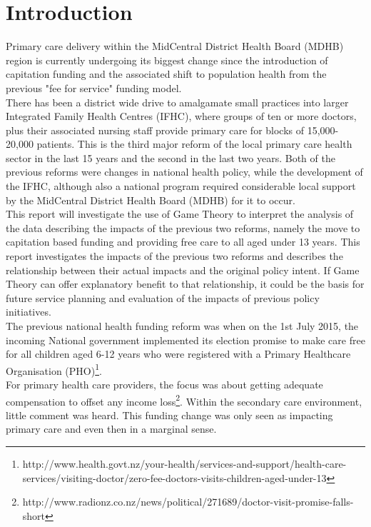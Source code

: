 \documentclass[11pt,a4paper]{article}
\begin{document}
\tableofcontents

\pagebreak
\pagebreak

\listoffigures

\pagebreak
\section{Introduction}
Primary care delivery within the MidCentral District Health Board (MDHB) region is currently undergoing its biggest change since the introduction of capitation funding and the associated shift to population health from the previous "fee for service" funding model.\\

There has been a district wide drive to amalgamate small practices into larger Integrated Family Health Centres (IFHC), where groups of ten or more doctors, plus their associated nursing staff provide primary care for blocks of  15,000-20,000 patients. This is the third major reform of the local primary care health sector in the last 15 years and the second in the last two years. Both of the previous reforms were changes in national health policy, while the development of the IFHC, although also a national program required considerable local support by the MidCentral District Health Board (MDHB) for it to occur. \\

This report will investigate the use of Game Theory to interpret the analysis of the data describing the impacts of the previous two reforms, namely the move to capitation based funding and providing free care to all aged under 13 years. This report investigates the impacts of the previous two reforms and describes the relationship between their actual impacts and the original policy intent. If Game Theory can offer explanatory benefit to that relationship, it could be the basis for future service planning and evaluation of the impacts of previous policy initiatives.\\ 

The previous national health funding reform was when on the 1st July 2015, the incoming National government implemented its election promise to make care free for all children aged 6-12 years who were registered with a Primary Healthcare Organisation (PHO)\footnote{http://www.health.govt.nz/your-health/services-and-support/health-care-services/visiting-doctor/zero-fee-doctors-visits-children-aged-under-13}.\\

For primary health care providers, the focus was about getting adequate compensation to offset any income loss\footnote{http://www.radionz.co.nz/news/political/271689/doctor-visit-promise-falls-short}. Within the secondary care environment, little comment was heard. This funding change was only seen as impacting primary care and even then in a marginal sense.\\
\end{document}
